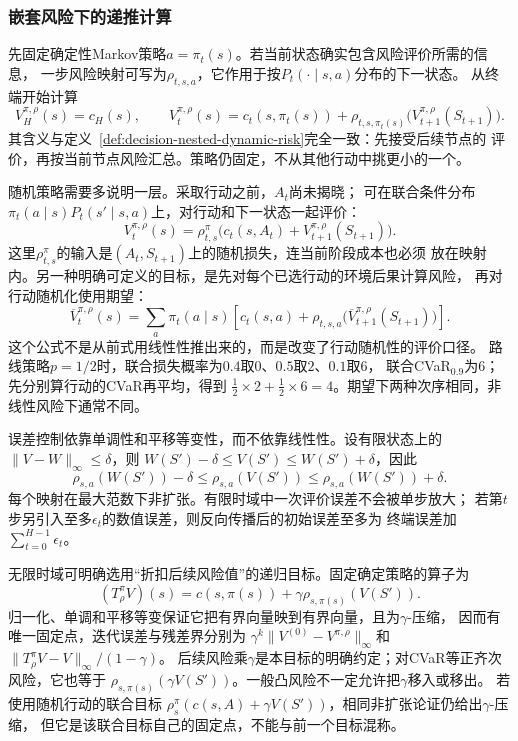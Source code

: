 \subsubsection{嵌套风险下的递推计算}
\label{sec:policy-nested-risk-evaluation}

先固定确定性Markov策略$a=\pi_t(s)$。若当前状态确实包含风险评价所需的信息，
一步风险映射可写为$\rho_{t,s,a}$，它作用于按$P_t(\cdot\mid s,a)$分布的下一状态。
从终端开始计算
\[
  V_H^{\pi,\rho}(s)=c_H(s),\qquad
  V_t^{\pi,\rho}(s)
  =c_t(s,\pi_t(s))+
    \rho_{t,s,\pi_t(s)}\bigl(V_{t+1}^{\pi,\rho}(S_{t+1})\bigr).
\]
其含义与定义~\ref{def:decision-nested-dynamic-risk}完全一致：先接受后续节点的
评价，再按当前节点风险汇总。策略仍固定，不从其他行动中挑更小的一个。

随机策略需要多说明一层。采取行动之前，$A_t$尚未揭晓；
可在联合条件分布
$\pi_t(a\mid s)P_t(s'\mid s,a)$上，对行动和下一状态一起评价：
\begin{equation}
  V_t^{\pi,\rho}(s)=
  \rho^\pi_{t,s}\bigl(c_t(s,A_t)+V_{t+1}^{\pi,\rho}(S_{t+1})\bigr).
  \label{eq:policy-joint-action-risk-evaluation}
\end{equation}
这里$\rho^\pi_{t,s}$的输入是$(A_t,S_{t+1})$上的随机损失，连当前阶段成本也必须
放在映射内。另一种明确可定义的目标，是先对每个已选行动的环境后果计算风险，
再对行动随机化使用期望：
\[
  \overline V_t^{\pi,\rho}(s)=\sum_a\pi_t(a\mid s)
    \left[c_t(s,a)+\rho_{t,s,a}
      \bigl(\overline V_{t+1}^{\pi,\rho}(S_{t+1})\bigr)\right].
\]
这个公式不是从前式用线性性推出来的，而是改变了行动随机性的评价口径。
路线策略$p=1/2$时，联合损失概率为$0.4$取$0$、$0.5$取$2$、$0.1$取$6$，
联合CVaR$_{0.9}$为$6$；先分别算行动的CVaR再平均，得到
$\tfrac12\times2+\tfrac12\times6=4$。期望下两种次序相同，非线性风险下通常不同。

误差控制依靠单调性和平移等变性，而不依靠线性性。设有限状态上的
$\lVert V-W\rVert_\infty\leq\delta$，则
$W(S')-\delta\leq V(S')\leq W(S')+\delta$，因此
\[
  \rho_{s,a}(W(S'))-\delta
  \leq\rho_{s,a}(V(S'))
  \leq\rho_{s,a}(W(S'))+\delta.
\]
每个映射在最大范数下非扩张。有限时域中一次评价误差不会被单步放大；
若第$t$步另引入至多$\epsilon_t$的数值误差，则反向传播后的初始误差至多为
终端误差加$\sum_{t=0}^{H-1}\epsilon_t$。

无限时域可明确选用“折扣后续风险值”的递归目标。固定确定策略的算子为
\[
  (T^\pi_\rho V)(s)
  =c(s,\pi(s))+\gamma\rho_{s,\pi(s)}(V(S')).
\]
归一化、单调和平移等变保证它把有界向量映到有界向量，且为$\gamma$-压缩，
因而有唯一固定点，迭代误差与残差界分别为
$\gamma^k\lVert V^{(0)}-V^{\pi,\rho}\rVert_\infty$和
$\lVert T^\pi_\rho V-V\rVert_\infty/(1-\gamma)$。
后续风险乘$\gamma$是本目标的明确约定；对CVaR等正齐次风险，它也等于
$\rho_{s,\pi(s)}(\gamma V(S'))$。一般凸风险不一定允许把$\gamma$移入或移出。
若使用随机行动的联合目标
$\rho^\pi_s(c(s,A)+\gamma V(S'))$，相同非扩张论证仍给出$\gamma$-压缩，
但它是该联合目标自己的固定点，不能与前一个目标混称。

